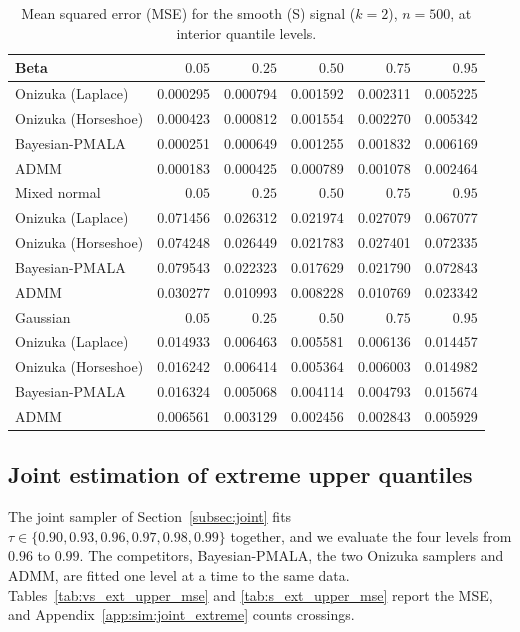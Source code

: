 \begin{table}[!htbp]
\centering
\small
\caption{Mean squared error (MSE) for the smooth (S) signal ($k=2$), $n=500$, at interior quantile levels.}
\label{tab:s_int_mse}
\begin{tabular}{lrrrrr}
\toprule
Beta & $0.05$ & $0.25$ & $0.50$ & $0.75$ & $0.95$ \\
\midrule
Onizuka (Laplace) & 0.000295 & 0.000794 & 0.001592 & 0.002311 & 0.005225 \\
Onizuka (Horseshoe) & 0.000423 & 0.000812 & 0.001554 & 0.002270 & 0.005342 \\
Bayesian-PMALA & 0.000251 & 0.000649 & 0.001255 & 0.001832 & 0.006169 \\
ADMM & 0.000183 & 0.000425 & 0.000789 & 0.001078 & 0.002464 \\
\midrule
Mixed normal & $0.05$ & $0.25$ & $0.50$ & $0.75$ & $0.95$ \\
\midrule
Onizuka (Laplace) & 0.071456 & 0.026312 & 0.021974 & 0.027079 & 0.067077 \\
Onizuka (Horseshoe) & 0.074248 & 0.026449 & 0.021783 & 0.027401 & 0.072335 \\
Bayesian-PMALA & 0.079543 & 0.022323 & 0.017629 & 0.021790 & 0.072843 \\
ADMM & 0.030277 & 0.010993 & 0.008228 & 0.010769 & 0.023342 \\
\midrule
Gaussian & $0.05$ & $0.25$ & $0.50$ & $0.75$ & $0.95$ \\
\midrule
Onizuka (Laplace) & 0.014933 & 0.006463 & 0.005581 & 0.006136 & 0.014457 \\
Onizuka (Horseshoe) & 0.016242 & 0.006414 & 0.005364 & 0.006003 & 0.014982 \\
Bayesian-PMALA & 0.016324 & 0.005068 & 0.004114 & 0.004793 & 0.015674 \\
ADMM & 0.006561 & 0.003129 & 0.002456 & 0.002843 & 0.005929 \\
\bottomrule
\end{tabular}
\end{table}

\subsection{Joint estimation of extreme upper quantiles}
\label{sec:sim:extreme}

The joint sampler of Section~\ref{subsec:joint} fits $\tau\in\{0.90,0.93,0.96,0.97,0.98,0.99\}$ together, and we evaluate the four levels from $0.96$ to $0.99$. The competitors, Bayesian-PMALA, the two Onizuka samplers and ADMM, are fitted one level at a time to the same data. Tables~\ref{tab:vs_ext_upper_mse} and \ref{tab:s_ext_upper_mse} report the MSE, and Appendix~\ref{app:sim:joint_extreme} counts crossings.

